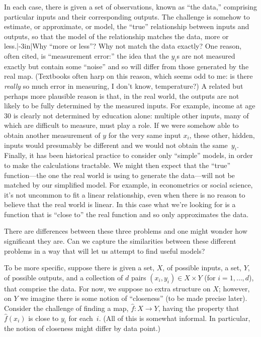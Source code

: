\documentclass[10pt, a4paper]{article}
\begin{document}
In each case, there is given a set of observations, known as “the
data,” comprising particular inputs and their corresponding
outputs. The challenge is somehow to estimate, or approximate, or
model, the “true” relationship between inputs and outputs, so that the
model of the relationship matches the data, more or
less.\sidenote|-3in|{Why “more or less”? Why not match the data
  exactly? One reason, often cited, is “measurement error:” the idea
  that the $y_i$s are not measured exactly but contain some “noise”
  and so will differ from those generated by the real map. (Textbooks
  often harp on this reason, which seems odd to me: is there
  \emph{really} so much error in measuring, I don't know,
  temperature?)\sidepar%
  A related but perhaps more plausible reason is that, in the real
  world, the outputs are not likely to be fully determined by the
  measured inputs. For example, income at age 30 is clearly not
  determined by education alone: multiple other inputs, many of which
  are difficult to measure, must play a role. If we were somehow able
  to obtain another measurement of $y$ for the very same input $x_i$,
  these other, hidden, inputs would presumably be different and we
  would not obtain the same~$y_i$.\sidepar%
  Finally, it has been historical practice to consider only “simple”
  models, in order to make the calculations tractable. We might then
  expect that the “true” function---the one the real world is using to
  generate the data---will not be matched by our simplified model. For
  example, in econometrics or social science, it's not uncommon to fit
  a linear relationship, even when there is no reason to believe that
  the real world is linear. In this case what we're looking for is a
  function that is “close to” the real function and so only
  approximates the data.}

There are differences between these three problems and one might
wonder how significant they are. Can we capture the similarities
between these different problems in a way that will let us attempt to
find useful models?

To be more specific, suppose there is given a set, $X$, of possible
inputs, a set, $Y$, of possible outputs, and a collection of $d$ pairs
$(x_i, y_i)\in X\times Y$ (for $i=1,\dots,d$), that comprise the data. For
now, we suppose no extra structure on $X$; however, on $Y$ we imagine
there is some notion of “closeness” (to be made precise
later). Consider the challenge of finding a map,
$\hat{f}\colon X\to Y$, having the property that $\hat{f}(x_i)$ is close
to $y_i$ for each~$i$. (All of this is somewhat informal. In
particular, the notion of closeness might differ by data point.)
\end{document}
